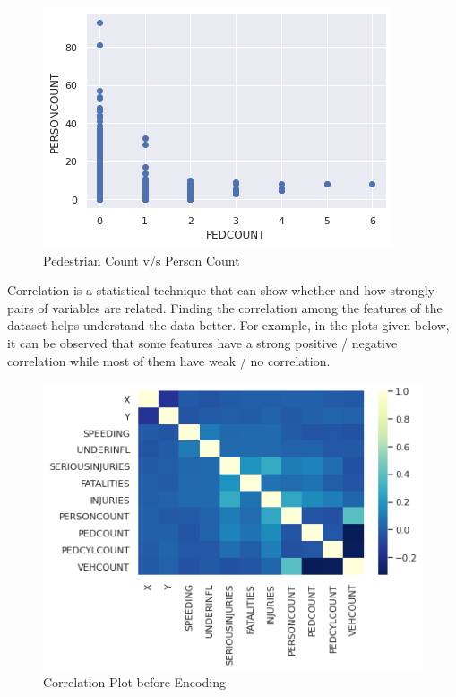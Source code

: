 \documentclass{article}
\begin{document}
\begin{figure}[H]
  \centering
  \includegraphics[scale=0.4]{pedperson.png}
  \caption{Pedestrian Count v/s Person Count}
\end{figure}

Correlation is a statistical technique that can show whether and how strongly pairs of variables are related. Finding the correlation among the features of the dataset helps understand the data better. For example, in the plots given below, it can be observed that some features have a strong positive / negative correlation while most of them have weak / no correlation.

\begin{figure}[H]
  \centering
  \includegraphics[scale=0.65]{heat1.png}
  \caption{Correlation Plot before Encoding}
\end{figure}
\end{document}
